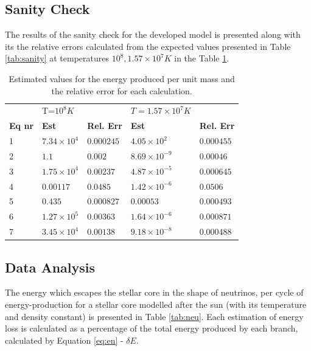 \documentclass[10pt, nofootinbib, twocolumn]{revtex4-1}
\begin{document}
\subsection{Sanity Check}
The results of the sanity check for the developed model is presented along with its the relative errors calculated from the expected values presented in Table \ref{tab:sanity} at temperatures $10^8, 1.57\times10^7K$ in the Table \ref{tab:check}.

\begin{center}
\begin{table}[H]
\caption{Estimated values for the energy produced per unit mass and the relative error for each calculation.}
    \begin{tabular*}{0.5\textwidth}{@{\extracolsep{\fill}}lllll}
    &  T=$10^8K$ &   & $T=1.57\times10^7K$ &  \\
    \textbf{Eq nr}   & \textbf{Est} & \textbf{Rel. Err}  & \textbf{Est} & \textbf{Rel. Err} \\
    \midrule
    1 & $7.34\times10^4$ & $0.000245$ & $4.05\times10^2$    & $0.000455$ \\
    2 & $1.1$            & $0.002$    & $8.69\times10^{-9}$ & $0.00046$  \\
    3 & $1.75\times10^4$ & $0.00237$  & $4.87\times10^{-5}$ & $0.000645$ \\
    4 & $0.00117$        & $0.0485$   & $1.42\times10^{-6}$ & $0.0506$   \\
    5 & $0.435$          & $0.000827$ & $0.00053$           & $0.000493$ \\
    6 & $1.27\times10^5$ & $0.00363$  & $1.64\times10^{-6}$ & $0.000871$ \\
    7 & $3.45\times10^4$ & $0.00138$  & $9.18\times10^{-8}$ & $0.000488$ \\
    \end{tabular*}
    \label{tab:check}
\end{table}
\end{center}


\subsection{Data Analysis}
The energy which escapes the stellar core in the shape of neutrinos, per cycle of energy-production for a stellar core modelled after the sun (with its temperature and density constant) is presented in Table \ref{tab:neu}. Each estimation of energy loss is calculated as a percentage of the total energy produced by each branch, calculated by Equation \eqref{eq:en} - $\delta E$. 
\end{document}
